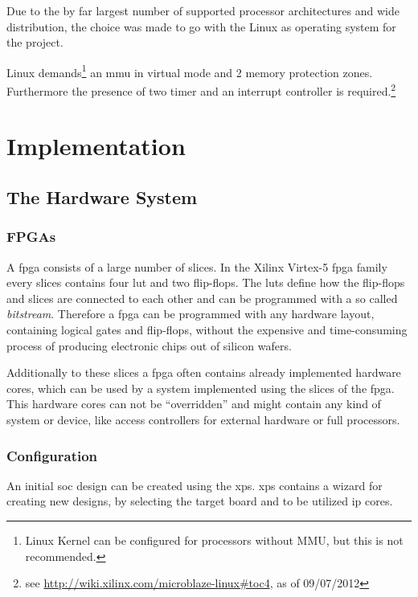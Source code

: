 Due to the by far largest number of supported processor architectures and wide distribution, the choice was made to go with the Linux as operating system for the project.

Linux demands\footnote{Linux Kernel can be configured for processors without MMU, but this is not recommended.} an \gls{mmu} in virtual mode and 2 memory protection zones. Furthermore the presence of two timer and an interrupt controller is required.\footnote{see \url{http://wiki.xilinx.com/microblaze-linux\#toc4}, as of 09/07/2012}


\chapter{Implementation}

\section{The Hardware System}

\subsection{FPGAs}

A \gls{fpga} consists of a large number of slices. In the Xilinx Virtex-5 \gls{fpga} family every slices contains four \gls{lut} and two flip-flops. The \gls{lut}s define how the flip-flops and slices are connected to each other and can be programmed with a so called \textit{bitstream}. Therefore a \gls{fpga} can be programmed with any hardware layout, containing logical gates and flip-flops, without the expensive and time-consuming process of producing electronic chips out of silicon wafers.

Additionally to these slices a \gls{fpga} often contains already implemented hardware cores, which can be used by a system implemented using the slices of the \gls{fpga}. This hardware cores can not be "`overridden"' and might contain any kind of system or device, like access controllers for external hardware or full processors.

\subsection{Configuration}

An initial \gls{soc} design can be created using the \gls{xps}. \gls{xps} contains a wizard for creating new designs, by selecting the target board and to be utilized  \gls{ip} cores. 

